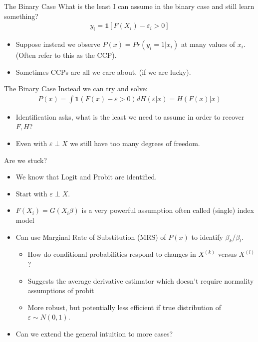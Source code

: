 \documentclass[11pt,handout,xcolor=pdftex,dvipsnames,table,mathserif,aspectratio=169]{beamer}
\begin{document}
\begin{frame}{The Binary Case}
What is the least I can assume in the binary case and still learn something?
\begin{eqnarray*}
y_i = \mathbf{1}[F(X_i) - \varepsilon_i > 0]
\end{eqnarray*}
\begin{itemize}
\item Suppose instead we observe $P(x) = Pr(y_i = 1 | x_i)$ at many values of $x_i$. (Often refer to this as the CCP).
\item Sometimes CCPs are all we care about. (if we are lucky).
\end{itemize}
\end{frame}


\begin{frame}{The Binary Case}
Instead we can try and solve:
\begin{eqnarray*}
P(x) = \int \mathbf{1}(F(x) - \varepsilon > 0) dH(\varepsilon | x) = H(F(x)| x)
\end{eqnarray*}
\begin{itemize}
\item Identification asks, what is the least we need to assume in order to recover $F,H$?
\item Even with $\varepsilon \perp X$ we still have too many degrees of freedom.
\end{itemize}
\end{frame}


\begin{frame}{Are we stuck?}

\begin{itemize}
\item We know that Logit and Probit are identified.
\item Start with $\varepsilon \perp X$.
\item $F(X_i) = G(X_i \beta)$ is a very powerful assumption often called \alert{(single) index model}
\item Can use Marginal Rate of Substitution (MRS) of $P(x)$ to identify $\beta_k / \beta_l$.
\begin{itemize}
\item How do conditional probabilities respond to changes in $X^{(k)}$ versus $X^{(l)}$?
\item Suggests the \alert{average derivative estimator} which doesn't require normality assumptions of probit
\item More robust, but potentially less efficient if true distribution of $\varepsilon \sim N(0,1)$.
\end{itemize}
\item Can we extend the general intuition to more cases?
\end{itemize}
\end{frame}
\end{document}
